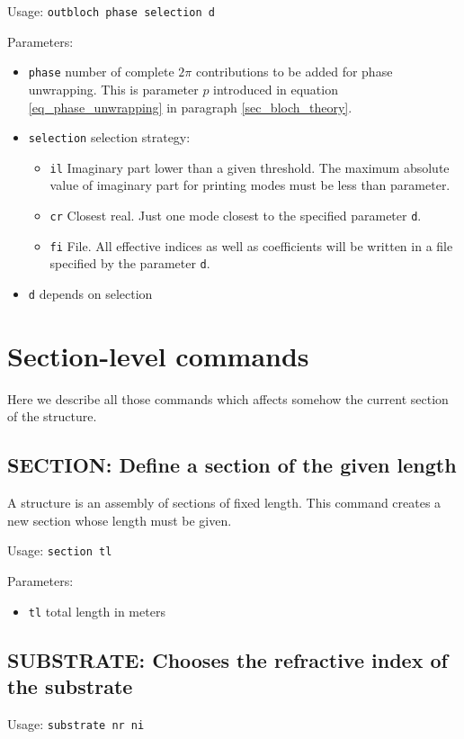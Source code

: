     
Usage: \lstinline!outbloch phase selection d!
        
Parameters:
\begin{itemize}
\item \lstinline!phase!     number of complete $2\pi$ contributions to be added for phase unwrapping. This is parameter $p$ introduced in equation \eqref{eq_phase_unwrapping} in paragraph \ref{sec_bloch_theory}.
\item \lstinline!selection! selection strategy:
\begin{itemize}
    \item \lstinline!il!        Imaginary part lower than a given threshold.  The maximum absolute 
                value of imaginary part for printing modes must be less than
                parameter.
    \item \lstinline!cr!        Closest real. Just one mode closest to the specified parameter \lstinline!d!.
    \item \lstinline!fi!        File. All effective indices as well as coefficients will be 
                written in a file specified by the parameter \lstinline!d!.
\end{itemize}
\item \lstinline!d!         depends on selection
\end{itemize}

\section{Section-level commands}
Here we describe all those commands which affects somehow the current section of the structure.

\subsection{SECTION: Define a section of the given length}
\label{subsec_section}
    A structure is an assembly of sections of fixed length. This command creates a new section whose length must be given.

    Usage: \lstinline!section tl!
    
    Parameters:
    \begin{itemize}
    \item\lstinline!tl! total length in meters
    \end{itemize}

\subsection{SUBSTRATE: Chooses the refractive index of the substrate} 
\label{subsec_substrate}
Usage: \lstinline!substrate nr ni!
 
